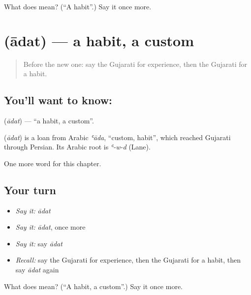 \begin{tcolorbox}[breakable,colback=teal!4,colframe=teal!35!black,title={Before you move on}]
What does  mean? (\textquotedblleft{}A habit\textquotedblright{}.) Say it once more.
\end{tcolorbox}
\section[\texorpdfstring{\gu{આદત} (ādat)}{આદત (ādat)}]{ (ādat) — a habit, a custom}

\label{lesson:GU-C104-adat}



\begin{quote}
Before the new one: say the Gujarati for experience, then the Gujarati for a habit.
\end{quote}

\subsection*{You'll want to know: }
\textbf{} (\emph{ādat}) — \textquotedblleft{}a habit, a custom\textquotedblright{}.

\begin{cousinweb}
\textbf{} (\emph{ādat}) is a loan from Arabic \emph{ʿāda}, \textquotedblleft{}custom, habit\textquotedblright{}, which reached Gujarati through Persian. Its Arabic root is \emph{ʿ-w-d} (Lane).
\end{cousinweb}

\begin{grammarlens}[title={What you've built}]
One more word for this chapter.
\end{grammarlens}

\subsection*{Your turn}
\begin{itemize}
\raggedright
  \item \emph{Say it:} \emph{ādat}
  \item \emph{Say it:} \emph{ādat}, once more
  \item \emph{Say it:} say \emph{ādat}
  \item \emph{Recall:} say the Gujarati for experience, then the Gujarati for a habit, then say \emph{ādat} again
\end{itemize}

\begin{tcolorbox}[breakable,colback=teal!4,colframe=teal!35!black,title={Before you move on}]
What does  mean? (\textquotedblleft{}A habit, a custom\textquotedblright{}.) Say it once more.
\end{tcolorbox}
